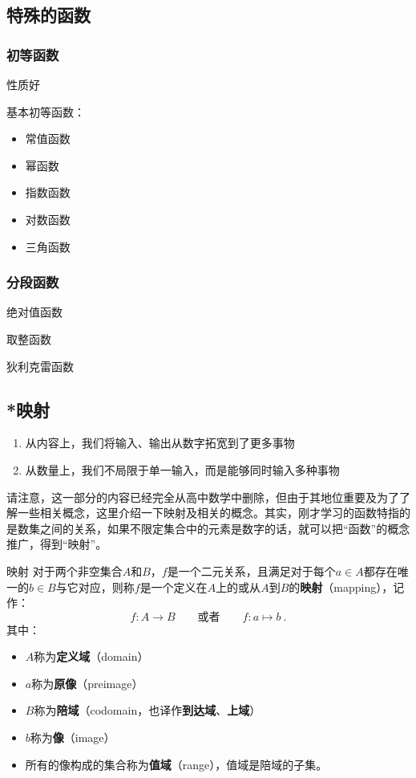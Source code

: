 \subsection{特殊的函数}

\subsubsection{初等函数}

性质好

基本初等函数：
\begin{itemize}
\item 常值函数
\item 幂函数
\item 指数函数
\item 对数函数
\item 三角函数
\end{itemize}

\subsubsection{分段函数}

绝对值函数

取整函数

狄利克雷函数

\subsection{*映射}

\begin{enumerate}
\item 从内容上，我们将输入、输出从数字拓宽到了更多事物
\item 从数量上，我们不局限于单一输入，而是能够同时输入多种事物
\end{enumerate}


请注意，这一部分的内容已经完全从高中数学中删除，但由于其地位重要及为了了解一些相关概念，这里介绍一下映射及相关的概念。其实，刚才学习的函数特指的是数集之间的关系，如果不限定集合中的元素是数字的话，就可以把“函数”的概念推广，得到“映射”。

\begin{definition}{映射}
对于两个非空集合$A$和$B$，$f$是一个二元关系，且满足对于每个$a\in A$都存在唯一的$b\in B$与它对应，则称$f$是一个定义在$A$上的或从$A$到$B$的\textbf{映射}（mapping），记作：
\begin{equation}
f:A\to B\qquad\text{或者}\qquad f:a\mapsto b~.
\end{equation}
其中：
\begin{itemize}
\item $A$称为\textbf{定义域}（domain）
\item $a$称为\textbf{原像}（preimage）
\item $B$称为\textbf{陪域}（codomain，也译作\textbf{到达域}、\textbf{上域}）
\item $b$称为\textbf{像}（image）
\item 所有的像构成的集合称为\textbf{值域}（range），值域是陪域的子集。
\end{itemize}
\end{definition}

